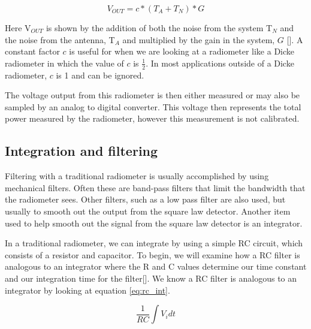 \begin{equation} \label{eq:vout_1}
V_{OUT}=c*(T_A+T_N)*G
\end{equation}

Here V$_{OUT}$ is shown by the addition of both the noise from the system T$_N$ and the noise from the antenna, T$_A$ and multiplied by the gain in the system, $G$ [\cite{skou}].  A constant factor $c$ is useful for when we are looking at a radiometer like a Dicke radiometer in which the value of $c$ is $\frac{1}{2}$.  In most applications outside of a Dicke radiometer, $c$ is 1 and can be ignored.  

The voltage output from this radiometer is then either measured or may also be sampled by an analog to digital converter.  This voltage then represents the total power measured by the radiometer, however this measurement is not calibrated.


\subsection{Integration and filtering}\label{int_filt}

Filtering with a traditional radiometer is usually accomplished by using mechanical filters.  Often these are band-pass filters that limit the bandwidth that the radiometer sees.  Other filters, such as a low pass filter are also used, but usually to smooth out the output from the square law detector.  Another item used to help smooth out the signal from the square law detector is an integrator.

In a traditional radiometer, we can integrate by using a simple RC circuit, which consists of a resistor and capacitor.  To begin, we will examine how a RC filter is analogous to an integrator where the R and C values determine our time constant and our integration time for the filter[\cite{Aitken}].  We know a RC filter is analogous to an integrator by looking at equation \ref{eq:rc_int}.  

\begin{equation}\label{eq:rc_int}
\frac{1}{RC}\int{V_idt}
\end{equation}

